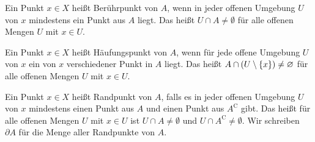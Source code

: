 \begin{definition}[Berührpunkt]
    Ein Punkt $x\in X$ heißt Berührpunkt von $A$, wenn in jeder offenen Umgebung $U$ von $x$ mindestens ein Punkt aus $A$ liegt. Das heißt $U\cap A \neq \emptyset$ für alle offenen Mengen $U$ mit $x\in U$.
\end{definition}

\begin{definition}[Häufungspunkt]
    Ein Punkt $x\in X$ heißt Häufungspunkt von $A$, wenn für jede offene Umgebung $U$ von $x$ ein von $x$ verschiedener Punkt in $A$ liegt. Das heißt $A\cap \left(U\setminus\left\{x\right\}\right) \neq \varnothing$ für alle offenen Mengen $U$ mit $x\in U$.
\end{definition}

\begin{definition}[Randpunkt]
    Ein Punkt $x\in X$ heißt Randpunkt von $A$, falls es in jeder offenen Umgebung $U$ von $x$ mindestens einen Punkt aus $A$ und einen Punkt aus $A^{\mathrm{C}}$ gibt. Das heißt für alle offenen Mengen $U$ mit $x\in U$ ist $U\cap A \neq \emptyset$ und $U\cap A^{\mathrm{C}} \neq \emptyset$. Wir schreiben $\partial A$ für die Menge aller Randpunkte von $A$.
\end{definition}

